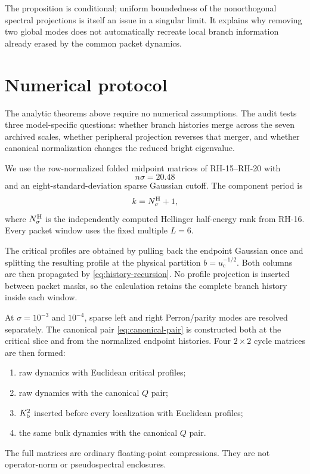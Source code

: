\documentclass[11pt]{article}
\theoremstyle{definition}
\theoremstyle{remark}
\newcommand{\uc}{u_{\mathrm c}}
\begin{document}
The proposition is conditional; uniform boundedness of the nonorthogonal
spectral projections is itself an issue in a singular limit.  It explains
why removing two global modes does not automatically recreate local branch
information already erased by the common packet dynamics.

\section{Numerical protocol}
\label{sec:protocol}

The analytic theorems above require no numerical assumptions.  The audit
tests three model-specific questions: whether branch histories merge across
the seven archived scales, whether peripheral projection reverses that
merger, and whether canonical normalization changes the reduced bright
eigenvalue.

We use the row-normalized folded midpoint matrices of RH-15--RH-20 with
\begin{equation}\label{eq:dimension-law}
 n\sigma=20.48
\end{equation}
and an eight-standard-deviation sparse Gaussian cutoff.  The component
period is
\begin{equation}\label{eq:period-selection}
 k=N_\sigma^{\rm H}+1,
\end{equation}
where $N_\sigma^{\rm H}$ is the independently computed Hellinger half-energy
rank from RH-16.  Every packet window uses the fixed multiple $L=6$.

The critical profiles are obtained by pulling back the endpoint Gaussian
once and splitting the resulting profile at the physical partition
$b=\uc^{-1/2}$.  Both columns are then propagated by
\eqref{eq:history-recursion}.  No profile projection is inserted between
packet masks, so the calculation retains the complete branch history inside
each window.

At $\sigma=10^{-3}$ and $10^{-4}$, sparse left and right Perron/parity modes
are resolved separately.  The canonical pair
\eqref{eq:canonical-pair} is constructed both at the critical slice and from
the normalized endpoint histories.  Four $2\times2$ cycle matrices are then
formed:
\begin{enumerate}[label=(\roman*),leftmargin=2.4em]
 \item raw dynamics with Euclidean critical profiles;
 \item raw dynamics with the canonical $Q$ pair;
 \item $K_{\rm b}^2$ inserted before every localization with Euclidean
 profiles;
 \item the same bulk dynamics with the canonical $Q$ pair.
\end{enumerate}
The full matrices are ordinary floating-point compressions.  They are not
operator-norm or pseudospectral enclosures.
\end{document}
